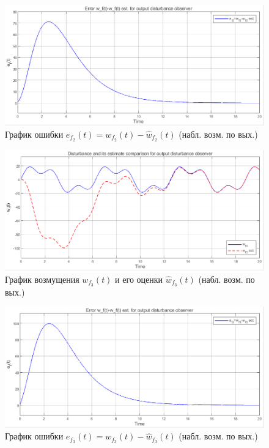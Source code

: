 \documentclass[a4paper, 12pt]{article}
\begin{document}
    \begin{figure}[H]
        \centering
        \includegraphics[scale=0.6]{3task_ef22.png}
        \captionsetup{skip=0pt}
        \caption{График ошибки $e_{f_2}(t)=w_{f_2}(t)-\hat{w}_{f_2}(t)$ (набл. возм. по вых.)}
        \label{fig:3task_ef22}
    \end{figure}
    \begin{figure}[H]
        \centering
        \includegraphics[scale=0.6]{3task_wfhwf32.png}
        \captionsetup{skip=0pt}
        \caption{График возмущения $w_{f_3}(t)$ и его оценки $\hat{w}_{f_3}(t)$ (набл. возм. по вых.)}
        \label{fig:3task_wfhwf32}
    \end{figure}
    \begin{figure}[H]
        \centering
        \includegraphics[scale=0.6]{3task_ef32.png}
        \captionsetup{skip=0pt}
        \caption{График ошибки $e_{f_3}(t)=w_{f_3}(t)-\hat{w}_{f_3}(t)$ (набл. возм. по вых.)}
        \label{fig:3task_ef32}
    \end{figure}
\end{document}
